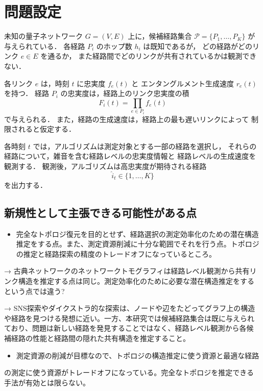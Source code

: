 \documentclass[conference]{IEEEtran}
\begin{document}
\section{問題設定}
\label{sec:orgcd935a2}
未知の量子ネットワーク \(G=(V,E)\) 上に，候補経路集合
\(\mathcal{P}=\{P_1,\ldots,P_K\}\) が与えられている．
各経路 \(P_i\) のホップ数 \(h_i\) は既知であるが，
どの経路がどのリンク \(e\in E\) を通るか，
また経路間でどのリンクが共有されているかは観測できない．

各リンク \(e\) は，時刻 \(t\) に忠実度 \(f_e(t)\) と
エンタングルメント生成速度 \(r_e(t)\) を持つ．
経路 \(P_i\) の忠実度は，経路上のリンク忠実度の積
\[
F_i(t)=\prod_{e\in P_i} f_e(t)
\]
で与えられる．
また，経路の生成速度は，経路上の最も遅いリンクによって
制限されると仮定する．

各時刻 \(t\) では，アルゴリズムは測定対象とする一部の経路を選択し，
それらの経路について，雑音を含む経路レベルの忠実度情報と
経路レベルの生成速度を観測する．
観測後，アルゴリズムは高忠実度が期待される経路
\[
\hat{i}_t \in \{1,\ldots,K\}
\]
を出力する．




\subsection{新規性として主張できる可能性がある点}
\label{sec:org0177078}
\begin{itemize}
\item 完全なトポロジ復元を目的とせず、経路選択の測定効率化のための潜在構造
推定をする点。また、測定資源削減に十分な範囲でそれを行う点。トポロジ
の推定と経路探索の精度のトレードオフになっているところ。
\end{itemize}

→ 古典ネットワークのネットワークトモグラフィは経路レベル観測から共有リ
ンク構造を推定する点は同じ。測定効率化のために必要な潜在構造推定をする
という点では違う?

→ SNS探索やダイクストラ的な探索は、ノードや辺をたどってグラフ上の構造
や経路を見つける発想に近い。一方、本研究では候補経路集合は既に与えられ
ており、問題は新しい経路を発見することではなく、経路レベル観測から各候
補経路の性能と経路間の隠れた共有構造を推定すること。


\begin{itemize}
\item 測定資源の削減が目標なので、トポロジの構造推定に使う資源と最適な経路
\end{itemize}
の測定に使う資源がトレードオフになっている。完全なトポロジを推定できる
手法が有効とは限らない。
\end{document}
